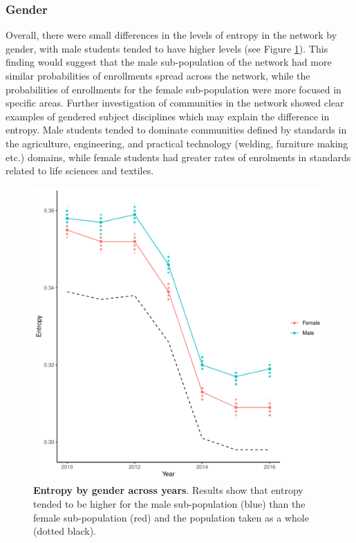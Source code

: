 \subsubsection*{Gender}
Overall, there were small differences in the levels of entropy in the network by gender, with male students tended to have higher levels (see Figure \ref{fig:Entropy_Gender}). This finding would suggest that the male sub-population of the network had more similar probabilities of enrollments spread across the network, while the probabilities of enrollments for the female sub-population were more focused in specific areas. Further investigation of communities in the network showed clear examples of gendered subject disciplines which may explain the difference in entropy. Male students tended to dominate communities defined by standards in the agriculture, engineering, and practical technology (welding, furniture making etc.) domains, while female students had greater rates of enrolments in standards related to life sciences and textiles. 

\begin{figure}[h]
    \centering
    \includegraphics[width = \textwidth]{C2 - Student Pathways/Entropy_Gender.pdf}
    \caption{\textbf{Entropy by gender across years}. Results show that entropy tended to be higher for the male sub-population (blue) than the female sub-population (red) and the population taken as a whole (dotted black).
    }
    
    \label{fig:Entropy_Gender}
\end{figure}


